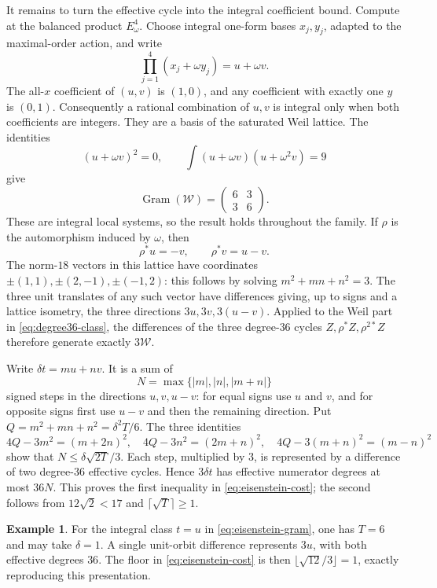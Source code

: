 \documentclass[11pt]{article}
\theoremstyle{definition}
\newtheorem{example}[theorem]{Example}
\theoremstyle{remark}
\begin{document}
It remains to turn the effective cycle into the integral coefficient bound. Compute at the balanced product $E_\omega^4$. Choose integral one-form bases $x_j,y_j$, adapted to the maximal-order action, and write
\[
 \prod_{j=1}^4(x_j+\omega y_j)=u+\omega v.
\]
The all-$x$ coefficient of $(u,v)$ is $(1,0)$, and any coefficient with exactly one $y$ is $(0,1)$. Consequently a rational combination of $u,v$ is integral only when both coefficients are integers. They are a basis of the saturated Weil lattice. The identities
\[
 (u+\omega v)^2=0,\qquad
 \int(u+\omega v)(u+\omega^2v)=9
\]
give
\begin{equation}\label{eq:eisenstein-gram}
 \operatorname{Gram}(\mathcal W)=
 \begin{pmatrix}6&3\\3&6\end{pmatrix}.
\end{equation}
These are integral local systems, so the result holds throughout the family. If $\rho$ is the automorphism induced by $\omega$, then
\[
 \rho^*u=-v,\qquad \rho^*v=u-v.
\]
The norm-$18$ vectors in this lattice have coordinates
$\pm(1,1),\pm(2,-1),\pm(-1,2)$: this follows by solving
$m^2+mn+n^2=3$. The three unit translates of any such vector have differences giving, up to signs and a lattice isometry, the three directions $3u,3v,3(u-v)$. Applied to the Weil part in \eqref{eq:degree36-class}, the differences of the three degree-$36$ cycles
$Z,\rho^*Z,\rho^{2*}Z$ therefore generate exactly $3\mathcal W$.

Write $\delta t=mu+nv$. It is a sum of
\[
 N=\max\{|m|,|n|,|m+n|\}
\]
signed steps in the directions $u,v,u-v$: for equal signs use $u$ and $v$, and for opposite signs first use $u-v$ and then the remaining direction. Put $Q=m^2+mn+n^2=\delta^2T/6$. The three identities
\[
 4Q-3m^2=(m+2n)^2,\quad
 4Q-3n^2=(2m+n)^2,\quad
 4Q-3(m+n)^2=(m-n)^2
\]
show that $N\leq\delta\sqrt{2T}/3$. Each step, multiplied by $3$, is represented by a difference of two degree-$36$ effective cycles. Hence $3\delta t$ has effective numerator degrees at most $36N$. This proves the first inequality in \eqref{eq:eisenstein-cost}; the second follows from $12\sqrt2<17$ and $\lceil\sqrt T\rceil\geq1$.

\begin{example}\label{ex:eisenstein-integral-class}
For the integral class $t=u$ in \eqref{eq:eisenstein-gram}, one has $T=6$ and may take $\delta=1$. A single unit-orbit difference represents $3u$, with both effective degrees $36$. The floor in \eqref{eq:eisenstein-cost} is then $\lfloor\sqrt{12}/3\rfloor=1$, exactly reproducing this presentation.
\end{example}
\end{document}
